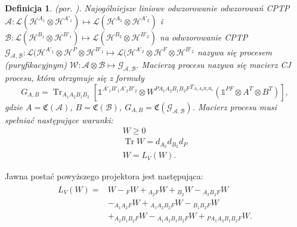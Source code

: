 \documentclass[10pt]{article} %
\newtheorem{definicja}{Definicja}
\DeclareMathOperator{\Trs}{Tr}
\newcommand{\Hx}[1]{\mathcal{H}^{#1}}
\newcommand{\I}{\mathbb{1}}
\newcommand{\MCJ}{\mathfrak{C}}
\begin{document}
\begin{definicja}
(por. \cite{purification}).
Najogólniejsze liniowe odwzorowanie odwzorowań CPTP $\mathcal{A}: \mathcal{L}(\Hx{A_1} \otimes \Hx{A'_1}) \mapsto  \mathcal{L}(\Hx{A_2} \otimes \Hx{A'_2})$ i $\mathcal{B}: \mathcal{L}(\Hx{B_1} \otimes \Hx{B'_1}) \mapsto  \mathcal{L}(\Hx{B_2} \otimes \Hx{B'_2})$ na odwzorowanie CPTP $\mathcal{G_{A,B}}: \mathcal{L}(\Hx{A'_1} \otimes \Hx{P} \otimes \Hx{B'_1} \mapsto \mathcal{L}(\Hx{A'_2} \otimes \Hx{F} \otimes \Hx{B'_2}$ nazywa się procesem (puryfikacyjnym) $\mathcal{W}: \mathcal{A} \otimes \mathcal{B} \mapsto \mathcal{G_{A,B}}$. Macierzą procesu nazywa się macierz CJ procesu, która otrzymuje się z formuły \cite{purification}
\begin{equation}
\label{eq:longnp}
G_{A,B} = \Trs_{A_1A_2B_1B_2}\left[ \I^{A'_1B'_1A'_2B'_2} \otimes {W^{PA_1A_2B_1B_2F}}^{T_{A_1A_2B_1B_2}} \left( \I^{PF} \otimes A^T \otimes B^T\right)\right],
\end{equation}
gdzie $A = \MCJ({\mathcal{A}})$, $B = \MCJ(\mathcal{B})$, $G_{A,B} = \MCJ(\mathcal{G_{A,B}})$.
Macierz procesu musi spełniać następujące warunki:
\begin{gather}
W \geq 0 \\
\Trs W = d_{A_2}d_{B_2}d_P \\
W = L_V(W).
\end{gather} 
\end{definicja}
Jawna postać powyższego projektora jest następująca:
\begin{align}
\begin{split}
L_V(W) =& W -{}_FW + {}_{A_2F}W + {}_{B_2}W - {}_{A_2B_2F}W\\ &- {}_{A_1A_2F}W + {}_{A_1A_2B_2F}W - {}_{B_1B_2F}W \\&+ {}_{A_2B_1B_2F}W - {}_{A_1A_2B_1B_2F}W + {}_{PA_1A_2B_1B_2F}W.
\end{split}
\end{align}
\end{document}
